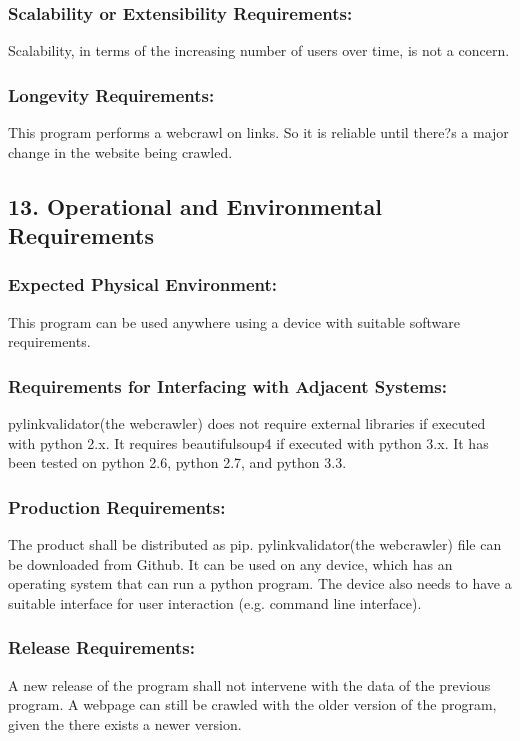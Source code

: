 \documentclass[titlepage]{article}
\begin{document}
\subsubsection*{Scalability or Extensibility Requirements:}
Scalability, in terms of the increasing number of users over time, is not a concern.

\subsubsection*{Longevity Requirements:}
This program performs a webcrawl on links. So it is reliable until there?s a major change in the website being crawled.

\subsection{13. Operational and Environmental Requirements }

\subsubsection*{Expected Physical Environment:}
This program can be used anywhere using a device with suitable software requirements. 

\subsubsection*{Requirements for Interfacing with Adjacent Systems:}
pylinkvalidator(the webcrawler) does not require external libraries if executed with python 2.x. It requires beautifulsoup4 if executed with python 3.x. It has been tested on python 2.6, python 2.7, and python 3.3.


\subsubsection*{Production Requirements:}

The product shall be distributed as pip. pylinkvalidator(the webcrawler) file can be downloaded from Github. It can be used on any device, which has an operating system that can run a python program. The device also needs to have a suitable interface for user interaction (e.g. command line interface).


\subsubsection*{Release Requirements: }
A new release of the program shall not intervene with the data of the previous program. A webpage can still be crawled with the older version of the program, given the there exists a newer version.
\end{document}
